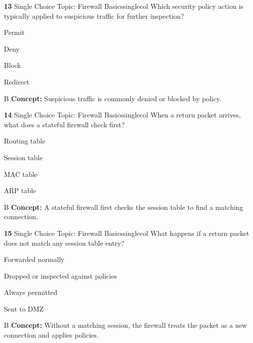 \documentclass[10pt,a4paper]{article}
\begin{document}
\begin{qcard}{\color{white}\textbf{13} \hfill \small Single Choice \textbar{} Topic: Firewall Basics}{singlecol}
Which security policy action is typically applied to suspicious traffic for further inspection?

\begin{qoptions}
\item Permit
\item Deny
\item Block
\item Redirect
\end{qoptions}
\begin{explainbox}{B}
\textbf{Concept:} Suspicious traffic is commonly denied or blocked by policy.
\end{explainbox}
\end{qcard}

\begin{qcard}{\color{white}\textbf{14} \hfill \small Single Choice \textbar{} Topic: Firewall Basics}{singlecol}
When a return packet arrives, what does a stateful firewall check first?

\begin{qoptions}
\item Routing table
\item Session table
\item MAC table
\item ARP table
\end{qoptions}
\begin{explainbox}{B}
\textbf{Concept:} A stateful firewall first checks the session table to find a matching connection.
\end{explainbox}
\end{qcard}

\begin{qcard}{\color{white}\textbf{15} \hfill \small Single Choice \textbar{} Topic: Firewall Basics}{singlecol}
What happens if a return packet does not match any session table entry?

\begin{qoptions}
\item Forwarded normally
\item Dropped or inspected against policies
\item Always permitted
\item Sent to DMZ
\end{qoptions}
\begin{explainbox}{B}
\textbf{Concept:} Without a matching session, the firewall treats the packet as a new connection and applies policies.
\end{explainbox}
\end{qcard}
\end{document}
